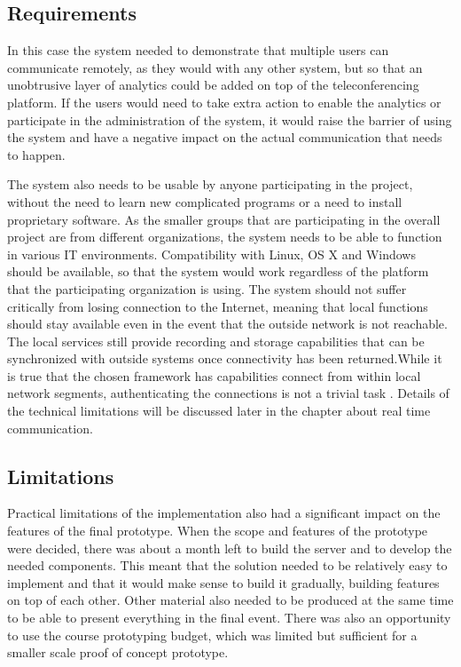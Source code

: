 \documentclass[english,12pt,a4paper,pdftex]{article}
\begin{document}
\subsection{Requirements}

In this case the system needed to demonstrate that multiple users can communicate remotely, as they would with any other system, but so that an unobtrusive layer of analytics could be added on top of the teleconferencing platform. If the users would need to take extra action to enable the analytics or participate in the administration of the system, it would raise the barrier of using the system and have a negative impact on the actual communication that needs to happen. 

The system also needs to be usable by anyone participating in the project, without the need to learn new complicated programs or a need to install proprietary software. As the smaller groups that are participating in the overall project are from different organizations, the system needs to be able to function in various IT environments. Compatibility with Linux, OS X and Windows should be available, so that the system would work regardless of the platform that the participating organization is using. The system should not suffer critically from losing connection to the Internet, meaning that local functions should stay available even in the event that the outside network is not reachable. The local services still provide recording and storage capabilities that can be synchronized with outside systems once connectivity has been returned.While it is true that the chosen framework has capabilities connect from within local network segments, authenticating the connections is not a trivial task \cite{Johnston}. Details of the technical limitations will be discussed later in the chapter about real time communication.


\subsection{Limitations}

Practical limitations of the implementation also had a significant impact on the features of the final prototype. When the scope and features of the prototype were decided, there was about a month left to build the server and to develop the needed components. This meant that the solution needed to be relatively easy to implement and that it would make sense to build it gradually, building features on top of each other. Other material also needed to be produced at the same time to be able to present everything in the final event. There was also an opportunity to use the course prototyping budget, which was limited but sufficient for a smaller scale proof of concept prototype.
\end{document}
